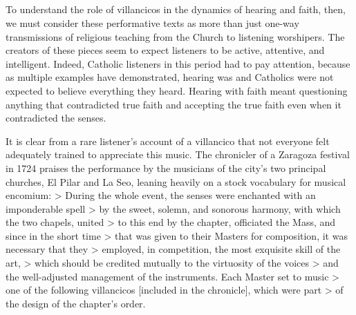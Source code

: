 \subsection{}

To understand the role of villancicos in the dynamics of hearing and faith, then, we must consider these performative texts as more than just one-way transmissions of religious teaching from the Church to listening worshipers.
The creators of these pieces seem to expect listeners to be active, attentive, and intelligent.
Indeed, Catholic listeners in this period had to pay attention, because as multiple examples have demonstrated, hearing was  and Catholics were not expected to believe everything they heard.
Hearing with faith meant questioning anything that contradicted true faith and accepting the true faith even when it contradicted the senses.

It is clear from a rare listener's account of a villancico that not everyone felt adequately trained to appreciate this music.
The chronicler of a Zaragoza festival in 1724 praises the performance by the musicians of the city's two principal churches, El Pilar and La Seo, leaning heavily on a stock vocabulary for musical encomium:
> During the whole event, the senses were enchanted with an imponderable spell > by the sweet, solemn, and sonorous harmony, with which the two chapels, united > to this end by the chapter, officiated the Mass, and since in the short time > that was given to their Masters for composition, it was necessary that they > employed, in competition, the most exquisite skill  of the art, > which should be credited mutually to the virtuosity  of the voices > and the well-adjusted management of the instruments.  Each Master set to music > one of the following villancicos [included in the chronicle], which were part > of the design of the chapter's order.

